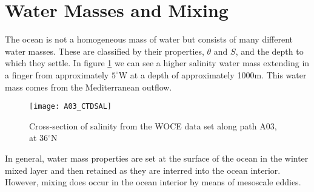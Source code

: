 \section{Water Masses and Mixing}
\label{section:lit_review_mixing}

The ocean is not a homogeneous mass of water but consists of many different water masses. These are classified by their properties, $\theta$ and $S$, and the depth to which they settle. In figure \ref{fig:salinitycrosssectionWOCE} we can see a higher salinity water mass extending in a finger from approximately $5^{\circ}$W at a depth of approximately 1000m. This water mass comes from the Mediterranean outflow. 

\begin{figure}[htbp]
    \centering
    \texttt{[image: A03\_CTDSAL]}
    \caption{Cross-section of salinity from the WOCE data set along path A03, at 36$^{\circ}$N \citep{WOCEAtlanticAtlas}}
    \label{fig:salinitycrosssectionWOCE}
\end{figure}

In general, water mass properties are set at the surface of the ocean in the winter mixed layer and then retained as they are interred into the ocean interior. However, mixing does occur in the ocean interior by means of mesoscale eddies. 